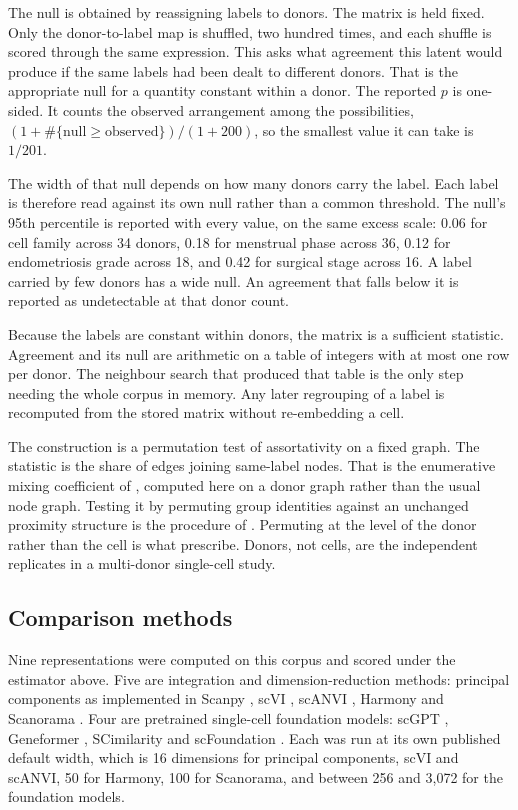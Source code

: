 The null is obtained by reassigning labels to donors. The matrix is held fixed. Only the
donor-to-label map is shuffled, two hundred times, and each shuffle is
scored through the same expression. This asks what agreement this latent
would produce if the same labels had been dealt to different donors. That is
the appropriate null for a quantity constant within a donor. The reported
$p$ is one-sided. It counts the observed arrangement among the
possibilities, $(1 + \#\{\text{null} \geq \text{observed}\}) / (1 + 200)$, so
the smallest value it can take is $1/201$.

The width of that null depends on how many donors carry the label. Each
label is therefore read against its own null rather than a common
threshold. The null's 95th percentile is reported with every value, on the
same excess scale: 0.06 for cell family across 34 donors, 0.18 for menstrual
phase across 36, 0.12 for endometriosis grade across 18, and 0.42 for
surgical stage across 16. A label carried by few donors has a wide null. An
agreement that falls below it is reported as undetectable at that donor
count.

Because the labels are constant within donors, the matrix is a sufficient
statistic. Agreement and its null are arithmetic on a table of integers with
at most one row per donor. The neighbour search that produced that table is
the only step needing the whole corpus in memory. Any later regrouping of a
label is recomputed from the stored matrix without re-embedding a cell.

The construction is a permutation test of assortativity on a fixed graph.
The statistic is the share of edges joining same-label nodes. That is the
enumerative mixing coefficient of \citet{newman2003mixing}, computed here on
a donor graph rather than the usual node graph. Testing it by permuting
group identities against an unchanged proximity structure is the procedure
of \citet{anderson2001permanova}. Permuting at the level of the donor rather
than the cell is what \citet{squair2021confronting} prescribe. Donors, not
cells, are the independent replicates in a multi-donor single-cell study.

\subsection*{Comparison methods}

Nine representations were computed on this corpus and scored under the
estimator above. Five are integration and dimension-reduction methods:
principal components as implemented in Scanpy \citep{wolf2018scanpy}, scVI
\citep{lopez2018scvi}, scANVI \citep{xu2021scanvi}, Harmony
\citep{korsunsky2019harmony} and Scanorama \citep{hie2019scanorama}. Four are
pretrained single-cell foundation models: scGPT \citep{cui2024scgpt},
Geneformer \citep{theodoris2023geneformer}, SCimilarity
\citep{heimberg2025scimilarity} and scFoundation \citep{hao2024scfoundation}.
Each was run at its own published default width, which is 16 dimensions for
principal components, scVI and scANVI, 50 for Harmony, 100 for Scanorama, and
between 256 and 3{,}072 for the foundation models.

